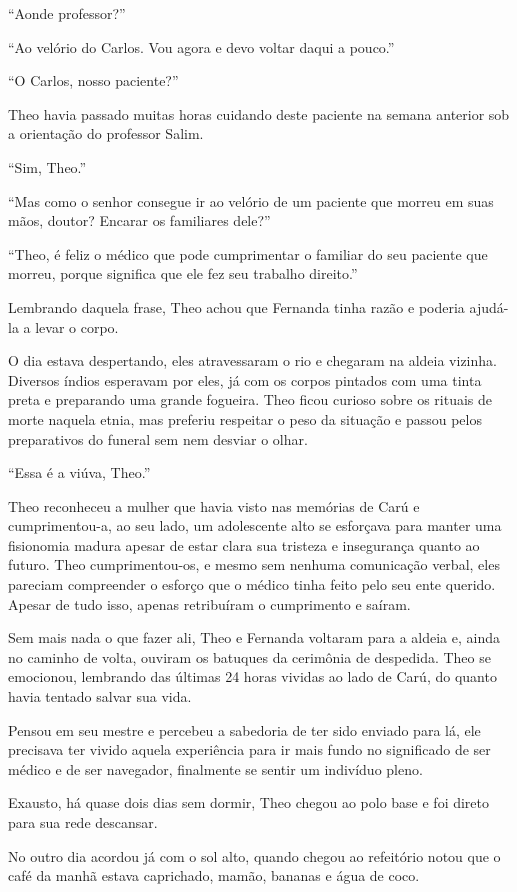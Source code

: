 ``Aonde professor?''

``Ao velório do Carlos. Vou agora e devo voltar daqui a pouco.''

``O Carlos, nosso paciente?''

Theo havia passado muitas horas cuidando deste paciente na semana
anterior sob a orientação do professor Salim.

``Sim, Theo.''

``Mas como o senhor consegue ir ao velório de um paciente que morreu em
suas mãos, doutor? Encarar os familiares dele?''

``Theo, é feliz o médico que pode cumprimentar o familiar do seu
paciente que morreu, porque significa que ele fez seu trabalho
direito.''

Lembrando daquela frase, Theo achou que Fernanda tinha razão e poderia
ajudá-la a levar o corpo.

O dia estava despertando, eles atravessaram o rio e chegaram na aldeia
vizinha. Diversos índios esperavam por eles, já com os corpos pintados
com uma tinta preta e preparando uma grande fogueira. Theo ficou curioso
sobre os rituais de morte naquela etnia, mas preferiu respeitar o peso
da situação e passou pelos preparativos do funeral sem nem desviar o
olhar.

``Essa é a viúva, Theo.''

Theo reconheceu a mulher que havia visto nas memórias de Carú e
cumprimentou-a, ao seu lado, um adolescente alto se esforçava para
manter uma fisionomia madura apesar de estar clara sua tristeza e
insegurança quanto ao futuro. Theo cumprimentou-os, e mesmo sem nenhuma
comunicação verbal, eles pareciam compreender o esforço que o médico
tinha feito pelo seu ente querido. Apesar de tudo isso, apenas
retribuíram o cumprimento e saíram.

Sem mais nada o que fazer ali, Theo e Fernanda voltaram para a aldeia e,
ainda no caminho de volta, ouviram os batuques da cerimônia de
despedida. Theo se emocionou, lembrando das últimas 24 horas vividas ao
lado de Carú, do quanto havia tentado salvar sua vida.

Pensou em seu mestre e percebeu a sabedoria de ter sido enviado para lá,
ele precisava ter vivido aquela experiência para ir mais fundo no
significado de ser médico e de ser navegador, finalmente se sentir um
indivíduo pleno.

Exausto, há quase dois dias sem dormir, Theo chegou ao polo base e foi
direto para sua rede descansar.

No outro dia acordou já com o sol alto, quando chegou ao refeitório
notou que o café da manhã estava caprichado, mamão, bananas e água de
coco.

